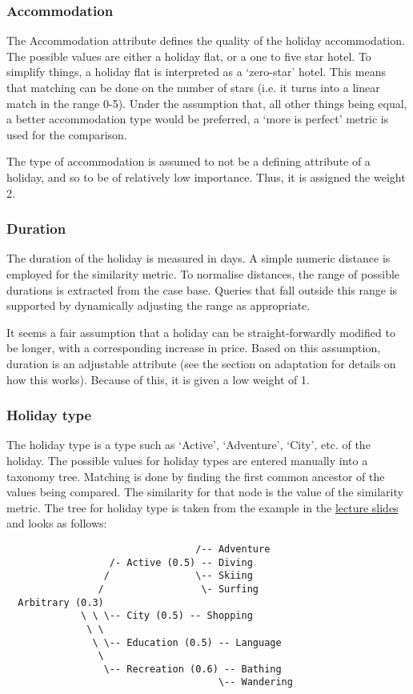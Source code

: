\documentclass[11pt]{article}
\begin{document}
\subsubsection{Accommodation}
The Accommodation attribute defines the quality of the holiday
accommodation. The possible values are either a holiday flat, or a one
to five star hotel. To simplify things, a holiday flat is interpreted
as a `zero-star' hotel. This means that matching can be done on the
number of stars (i.e. it turns into a linear match in the range 0-5).
Under the assumption that, all other things being equal, a better
accommodation type would be preferred, a `more is perfect' metric is
used for the comparison.

The type of accommodation is assumed to not be a defining attribute of
a holiday, and so to be of relatively low importance. Thus, it is
assigned the weight 2.

\subsubsection{Duration}
The duration of the holiday is measured in days. A simple numeric
distance is employed for the similarity metric. To normalise
distances, the range of possible durations is extracted from the case
base. Queries that fall outside this range is supported by dynamically
adjusting the range as appropriate.

It seems a fair assumption that a holiday can be straight-forwardly
modified to be longer, with a corresponding increase in price. Based
on this assumption, duration is an adjustable attribute (see the
section on adaptation for details on how this works). Because of this,
it is given a low weight of 1.

\subsubsection{Holiday type}
The holiday type is a type such as `Active', `Adventure', `City', etc.
of the holiday. The possible values for holiday types are entered
manually into a taxonomy tree. Matching is done by finding the first
common ancestor of the values being compared. The similarity for that
node is the value of the similarity metric. The tree for holiday type
is taken from the example in the \href{http://www.cs.auckland.ac.nz/~ian/CBR/cbr03.pdf}{lecture slides} and looks as follows:

\begin{verbatim}
                                 /-- Adventure
                  /- Active (0.5) -- Diving
                 /               \-- Skiing
                /                 \- Surfing
  Arbitrary (0.3)
             \ \ \-- City (0.5) -- Shopping
              \ \
               \ \-- Education (0.5) -- Language
                \
                 \-- Recreation (0.6) -- Bathing
                                     \-- Wandering
\end{verbatim}
\end{document}
